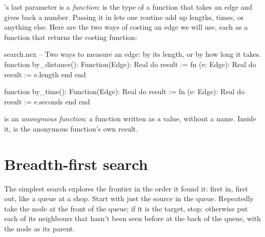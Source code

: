 's last parameter is a \emph{function}:
 is the type of a function that takes an edge
and gives back a number. Passing it in lets one routine add up lengths,
times, or anything else. Here are the two ways of costing an edge we will
use, each as a function that returns the costing function:

\begin{append}{search.nex}
-- Two ways to measure an edge: by its length, or by how long it takes.
function by_distance(): Function(Edge): Real do
  result := fn (e: Edge): Real do result := e.length end
end

function by_time(): Function(Edge): Real do
  result := fn (e: Edge): Real do result := e.seconds end
end
\end{append}

 is an \emph{anonymous function}: a
function written as a value, without a name. Inside it,  is
the anonymous function's own result.

\section{Breadth-first search}

The simplest search explores the frontier in the order it found it: first
in, first out, like a queue at a shop. Start with just the source in the
queue. Repeatedly take the node at the front of the queue; if it is the
target, stop; otherwise put each of its neighbours that hasn't been seen
before at the back of the queue, with the node as its parent.

\begin{center}
\end{center}

